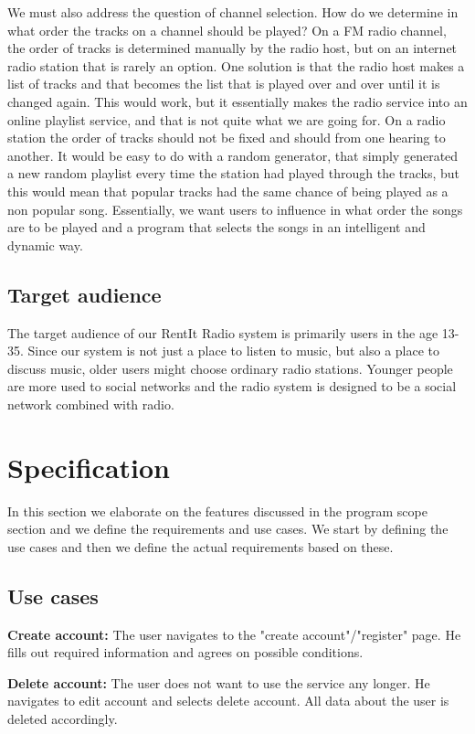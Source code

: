 \documentclass[a4paper,11pt,report]{article}
\begin{document}
We must also address the question of channel selection. How do we determine in what order the tracks on a channel should be played? On a FM radio channel, the order of tracks is determined manually by the radio host, but on an internet radio station that is rarely an option. One solution is that the radio host makes a list of tracks and that becomes the list that is played over and over until it is changed again. This would work, but it essentially makes the radio service into an online playlist service, and that is not quite what we are going for. On a radio station the order of tracks should not be fixed and should from one hearing to another. It would be easy to do with a random generator, that simply generated a new random playlist every time the station had played through the tracks, but this would mean that popular tracks had the same chance of being played as a non popular song. Essentially, we want users to influence in what order the songs are to be played and a program that selects the songs in an intelligent and dynamic way. 

\subsection{Target audience}
The target audience of our RentIt Radio system is primarily users in the age 13-35. Since our system is not just a place to listen to music, but also a place to discuss music,  older users might choose ordinary radio stations. Younger people are more used to social networks and the radio system is designed to be a social network combined with radio.

\section{Specification}
In this section we elaborate on the features discussed in the program scope section and we define the requirements and use cases. We start by defining the use cases and then we define the actual requirements based on these. 
\subsection{Use cases}
\textbf{Create account:}
The user navigates to the "create account"/"register" page. He fills out required information and agrees on possible conditions.

\textbf{Delete account:}
The user does not want to use the service any longer. He navigates to edit account and selects delete account. All data about the user is deleted accordingly.
\end{document}
